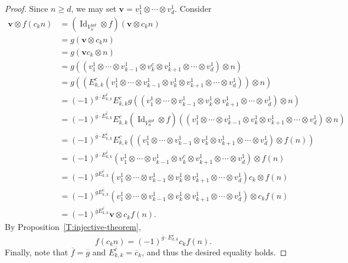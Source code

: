 \documentclass[11pt,reqno]{amsart} %
\newcommand{\0}{\bar{0}}
\newcommand{\1}{\bar{1}}
\newcommand{\parity}[1]{\overline{#1}}
\newcommand{\Id}{\operatorname{Id}}
\newcommand{\bv}{\mathbf{v}}
\numberwithin{equation}{subsection}
\begin{document}
\begin{proof}
Since $n \geq d$, we may set $\bv = v^{1}_{1} \otimes \dotsb \otimes v^{1}_{d}$.  Consider
\begin{align*}
\bv \otimes f \left( c_{k}n \right) &= \left(\Id_{V_{n}^{\otimes d}} \otimes f \right) \left(\bv \otimes c_{k}n \right) \\
&= g\left(\bv \otimes c_{k}n \right) \\
&= g\left(\bv c_{k} \otimes n \right) \\
&= g\left( (v_{1}^1 \otimes \dotsb \otimes v_{k-1}^{1}\otimes  v_{k}^{c} \otimes v_{k+1}^{1} \otimes \dotsb \otimes v_{d}^{1}) \otimes  n \right) \\
&= g \left(\left( E_{k,k}^{c}( v^{1}_{1} \otimes \dotsb \otimes v_{k-1}^{1}\otimes  v_{k}^{1} \otimes v_{k+1}^{1} \otimes \dotsb \otimes v_{d}^{1}) \right) \otimes  n\right)\\
&= (-1)^{\parity{g}\cdot \parity{E_{k,k}^{c}}} E_{k,k}^{c} g \left( (v_{1}^1 \otimes \dotsb \otimes v_{k-1}^{1}\otimes  v_{k}^{1} \otimes v_{k+1}^{1} \otimes \dotsb \otimes v_{d}^{1}) \otimes  n\right) \\
&=(-1)^{\parity{g}\cdot \parity{E_{k,k}^{c}}} E_{k,k}^{c} \left( \Id_{V_{n}^{\otimes d}} \otimes f\right)  \left((v_{1}^1 \otimes \dotsb \otimes v_{k-1}^{1}\otimes  v_{k}^{1} \otimes v_{k+1}^{1} \otimes \dotsb \otimes v_{d}^{1}) \otimes  n\right)\\
&=(-1)^{\parity{g}\cdot \parity{E_{k,k}^{c}}} E_{k,k}^{c}\left( (v_{1}^1 \otimes \dotsb \otimes v_{k-1}^{1}\otimes  v_{k}^{1} \otimes v_{k+1}^{1} \otimes \dotsb \otimes v_{d}^{1}) \otimes  f(n)\right)\\
&=(-1)^{\parity{g}\cdot \parity{E_{k,k}^{c}}} (v_{1}^1 \otimes \dotsb \otimes v_{k-1}^{1}\otimes  v_{k}^{c} \otimes v_{k+1}^{1} \otimes \dotsb \otimes v_{d}^{1}) \otimes  f(n)\\
&=(-1)^{\parity{g}\parity{E_{k,k}^{c}}} (v_{1}^1 \otimes \dotsb \otimes v_{k-1}^{1}\otimes  v_{k}^{1} \otimes v_{k+1}^{1} \otimes \dotsb \otimes v_{d}^{1})c_{k} \otimes  f(n) \\
&=(-1)^{\parity{g}\parity{E_{k,k}^{c}}} (v_{1}^1 \otimes \dotsb \otimes v_{k-1}^{1}\otimes  v_{k}^{1} \otimes v_{k+1}^{1} \otimes \dotsb \otimes v_{d}^{1}) \otimes  c_{k}f(n)\\
&= (-1)^{\parity{g}\parity{E_{k,k}^{c}}} \bv \otimes  c_{k}f(n).
\end{align*}  By Proposition~\ref{T:injective-theorem}, 
\[
f \left( c_{k}n \right) = (-1)^{\parity{g} \cdot \parity{E_{k,k}^{c}}}c_{k} f(n).
\]  Finally, note that $\parity{f}=\parity{g}$ and $\parity{E_{k,k}^{c}} = \parity{c}_{k}$, and thus the desired equality holds.
\end{proof}
\end{document}
